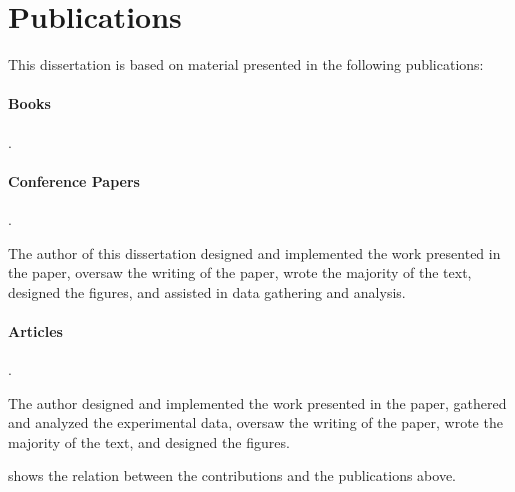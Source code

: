 \section{Publications}

This dissertation is based on material presented in the following publications:


\paragraph{Books}

\begin{publications}
  \item {}
    .
\end{publications}


\paragraph{Conference Papers}

\begin{publications}[resume]
  \item {}
    .
    \begin{authorsContribution}
      The author of this dissertation designed and implemented the work
      presented in the paper, oversaw the writing of the paper, wrote the
      majority of the text, designed the figures, and assisted in data gathering
      and analysis.
    \end{authorsContribution}
\end{publications}


\paragraph{Articles}

\begin{publications}[resume]
  \item {}
    .
    \begin{authorsContribution}
      The author designed and implemented the work presented in the paper,
      gathered and analyzed the experimental data, oversaw the writing of the
      paper, wrote the majority of the text, and designed the figures.
    \end{authorsContribution}
\end{publications}
%
 shows the relation between the
contributions and the publications above.

